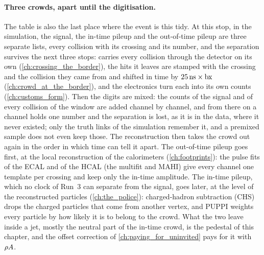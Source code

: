 \paragraph{Three crowds, apart until the digitisation.}
\label{sec:crowd_on_the_road:three_crowds}
The table is also the last place where the event is this tidy. At this
stop, in the simulation, the signal, the in-time pileup and the
out-of-time pileup are three separate lists, every collision with its
crossing and its number, and the separation survives the next three
stops: \GEANT carries every collision through the detector on its own
(\cref{ch:crossing_the_border}), the hits it leaves are stamped with the
crossing and the collision they came from and shifted in time by
$25\,\mathrm{ns}\times\mathrm{bx}$ (\cref{ch:crowd_at_the_border}), and the electronics
turn each into its own counts (\cref{ch:customs_form}). Then the digits
are mixed: the counts of the signal and of every collision of the window
are added channel by channel, and from there on a channel holds one
number and the separation is lost, as it is in the data, where it never
existed; only the truth links of the simulation remember it, and a
premixed sample does not even keep those. The reconstruction then takes
the crowd out again in the order in which time can tell it apart. The
out-of-time pileup goes first, at the local reconstruction of the
calorimeters (\cref{ch:footprints}): the pulse fits of the ECAL and of the
HCAL (the multifit and MAHI) give every channel one template per
crossing and keep only the in-time amplitude. The in-time pileup, which
no clock of Run~3 can separate from the signal, goes later, at the level
of the reconstructed particles (\cref{ch:the_police}): charged-hadron
subtraction (CHS) drops the charged particles that come from another
vertex, and PUPPI weights every particle by how likely it is to belong
to the crowd. What the two leave inside a jet, mostly the neutral part of
the in-time crowd, is the pedestal of this chapter, and the offset
correction of \cref{ch:paying_for_uninvited} pays for it with
$\rho A$.

